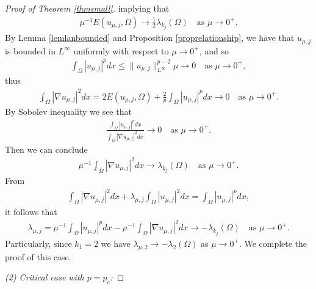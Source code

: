 \documentclass[10pt,a4paper]{article}
\theoremstyle{definition} \theoremstyle{remark}
\numberwithin{equation}{section}
\newcommand{\la}{\lambda}
\begin{document}
\begin{proof}[Proof of Theorem \ref{thmsmall}]
implying that
\begin{align*}
	\mu^{-1}E(u_{\mu,j},\Omega) \to \frac12\la_{k_j}(\Omega) \quad \text{as } \mu \to 0^+.
\end{align*}
By Lemma \ref{lemlanbounded} and Proposition \ref{proprelationship}, we have that $u_{\mu,j}$ is bounded in $L^\infty$ uniformly with respect to $\mu \to 0^+$, and so
\begin{align*}
	\int_\Omega |u_{\mu,j}|^pdx \le \|u_{\mu,j}\|_{L^\infty}^{p-2}\mu \to 0 \quad \text{as } \mu \to 0^+,
\end{align*}
thus
\begin{align*}
	\int_\Omega |\nabla u_{\mu,j}|^2dx = 2E(u_{\mu,j},\Omega) + \frac2p\int_\Omega |u_{\mu,j}|^pdx \to 0 \quad \text{as } \mu \to 0^+.
\end{align*}
By Sobolev inequality we see that
\begin{align*}
	\frac{\int_\Omega |u_{\mu,j}|^pdx}{\int_\Omega |\nabla u_{\mu,j}|^2dx} \to 0 \quad \text{as } \mu \to 0^+.
\end{align*}
Then we can conclude
\begin{align*}
	\mu^{-1}\int_\Omega|\nabla u_{\mu,j}|^2dx \to \la_{k_j}(\Omega) \quad \text{as } \mu \to 0^+.
\end{align*}
From
\begin{align*}
	\int_\Omega |\nabla u_{\mu,j}|^2 dx + \la_{\mu,j} \int_\Omega |u_{\mu,j}|^2dx = \int_\Omega |u_{\mu,j}|^p dx,
\end{align*}
it follows that
\begin{align*}
	\la_{\mu,j} = \mu^{-1}\int_\Omega |u_{\mu,j}|^p dx - \mu^{-1}\int_\Omega |\nabla u_{\mu,j}|^2 dx \to - \la_{k_j}(\Omega) \quad \text{as } \mu \to 0^+.
\end{align*}
Particularly, since $k_1 = 2$ we have $\la_{\mu,2} \to -\la_2(\Omega)$ as $\mu \to 0^+$. We complete the proof of this case.

\vskip0.1in
\emph{(2) Critical case with $p = p_c$: }


\end{proof}
\end{document}
